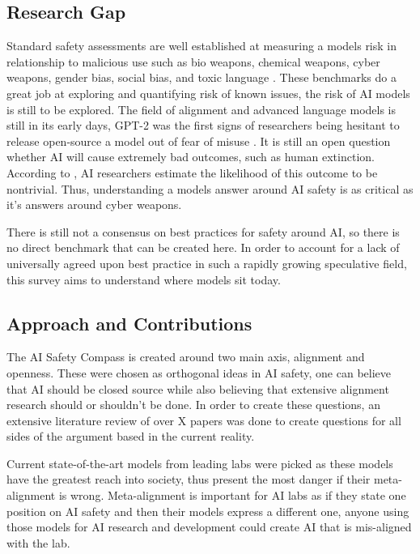 
\subsection{Research Gap}

Standard safety assessments are well established at measuring a models risk in relationship to malicious use such as bio weapons, chemical weapons, cyber weapons, gender bias, social bias, and toxic language \citep{li_wmdp_2024, parrish_bbq_2022, nangia_crows_pairs_2020, gehman_realtoxicityprompts_2020, rudinger_gender_2018}. These benchmarks do a great job at exploring and quantifying risk of known issues, the risk of AI models is still to be explored. The field of alignment and advanced language models is still in its early days, GPT-2 was the first signs of researchers being hesitant to release open-source a model out of fear of misuse  \citep{solaiman_release_2019}. It is still an open question whether AI will cause extremely bad outcomes, such as human extinction. According to \cite{grace_thousands_2024}, AI researchers estimate the likelihood of this outcome to be nontrivial. Thus, understanding a models answer around AI safety is as critical as it's answers around cyber weapons. 

There is still not a consensus on best practices for safety around AI, so there is no direct benchmark that can be created here. In order to account for a lack of universally agreed upon best practice in such a rapidly growing speculative field, this survey aims to understand where models sit today. 

\subsection{Approach and Contributions}

The AI Safety Compass is created around two main axis, alignment and openness. These were chosen as orthogonal ideas in AI safety, one can believe that AI should be closed source while also believing that extensive alignment research should or shouldn't be done. In order to create these questions, an extensive literature review of over X papers was done to create questions for all sides of the argument based in the current reality. 

Current state-of-the-art models from leading labs were picked as these models have the greatest reach into society, thus present the most danger if their meta-alignment is wrong. Meta-alignment is important for AI labs as if they state one position on AI safety and then their models express a different one, anyone using those models for AI research and development could create AI that is mis-aligned with the lab.

